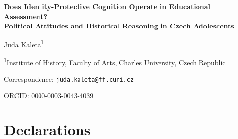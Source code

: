 \documentclass[12pt]{article}
\begin{document}
\begin{center}
{\Large\bfseries Does Identity-Protective Cognition Operate in Educational Assessment?\\[4pt]
Political Attitudes and Historical Reasoning in Czech Adolescents}

\bigskip

Juda Kaleta\textsuperscript{1}

\medskip

\textsuperscript{1}Institute of History, Faculty of Arts, Charles University, Czech Republic

\medskip

Correspondence: \texttt{juda.kaleta@ff.cuni.cz}

\medskip

ORCID: 0000-0003-0043-4039
\end{center}

\bigskip

\section*{Declarations}
\end{document}
